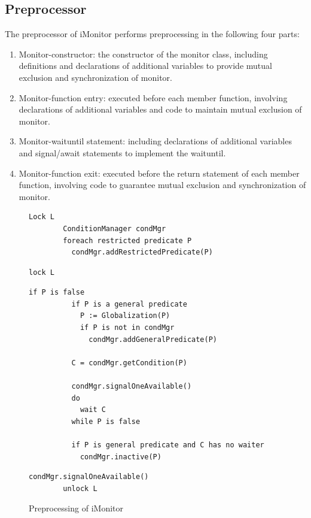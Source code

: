 \documentclass[preprint]{sigplanconf}
\begin{document}
\subsection{Preprocessor}
The preprocessor of iMonitor performs preprocessing in the following four 
parts:
\begin{enumerate}
  \item Monitor-constructor: the constructor of the monitor class, including 
    definitions and declarations of additional variables to provide mutual 
    exclusion and synchronization of monitor. 
  \item Monitor-function entry: executed before each member function, 
    involving declarations of additional variables and code to maintain
    mutual exclusion of monitor. 
  \item Monitor-waituntil statement: including declarations of additional
    variables and signal/await statements to implement the waituntil.
  \item Monitor-function exit: executed before the return statement of 
    each member function, involving code to guarantee mutual exclusion and 
    synchronization of monitor. 
\end{enumerate}
\begin{figure}[ht!]
    \begin{Verbatim}[fontsize=\footnotesize,gobble=8,frame=topline,
            framesep=3mm,label=\fbox{\small\emph{Constructor}}]
        Lock L
        ConditionManager condMgr 
        foreach restricted predicate P
          condMgr.addRestrictedPredicate(P)
    \end{Verbatim}
    \begin{Verbatim}[fontsize=\footnotesize,gobble=8,frame=topline,
            framesep=3mm,label=\fbox{\small\emph{Entry}}]
        lock L
    \end{Verbatim}
    \begin{Verbatim}[fontsize=\footnotesize,gobble=8,frame=topline,
            framesep=3mm,label=\fbox{\small\emph{Waituntil(P)}}]
        if P is false 
          if P is a general predicate 
            P := Globalization(P)
            if P is not in condMgr
              condMgr.addGeneralPredicate(P)
              
          C = condMgr.getCondition(P)
        
          condMgr.signalOneAvailable()
          do 
            wait C
          while P is false
       
          if P is general predicate and C has no waiter
            condMgr.inactive(P) 
    \end{Verbatim}
    \begin{Verbatim}[fontsize=\footnotesize,gobble=8,frame=lines,
            framesep=3mm,label=\fbox{\small\emph{Exit}}]
        condMgr.signalOneAvailable() 
        unlock L
    \end{Verbatim}
  \caption{Preprocessing of iMonitor}
  \label{fig:prep}
\end{figure}  
\end{document}
